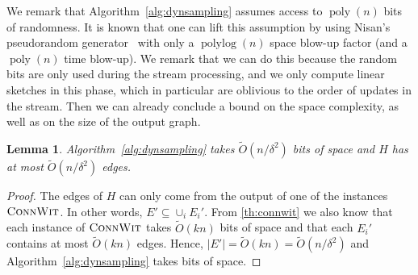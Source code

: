 \documentclass[epsfig,letter,11pt]{article}
\numberwithin{equation}{section}
\newcommand{\otil}{\tilde{O}}
\renewcommand{\tilde}{\widetilde}
\DeclareMathOperator*{\poly}{poly}
\DeclareMathOperator*{\pylog}{polylog}
\newtheorem{lemma}[theorem]{Lemma}
\begin{document}
We remark that Algorithm~\ref{alg:dynsampling} assumes access to $\poly(n)$ bits of randomness. It is known that one can lift this assumption by using Nisan's pseudorandom generator~\cite{nisansprg,lpindyk} with only a $\pylog(n)$ space blow-up factor (and a $\poly(n)$ time blow-up). We remark that we can do this because the random bits are only used during the stream processing, and we only compute linear sketches in this phase, which in particular are oblivious to the order of updates in the stream. Then we can already conclude a bound on the space complexity, as well as on the size of the output graph.
\begin{lemma}
	\label{lem:spacesampling}
	Algorithm~\ref{alg:dynsampling} takes $\otil(n/\delta^2)$ bits of space and $H$ has at most $\otil(n/\delta^2)$ edges.
\end{lemma}
\begin{proof}
	The edges of $H$ can only come from the output of one of the instances $\textsc{ConnWit}$. In other words, $E' \subseteq \cup_i E_i'$. From \cref{th:connwit} we also know that each instance of $\textsc{ConnWit}$ takes $\otil(kn)$ bits of space and that each $E_i'$ contains at most $\otil(kn)$ edges. Hence, $|E'| = \otil(kn)=\otil(n/\delta^2)$ and Algorithm~\ref{alg:dynsampling} takes \smash{$\otil(kn) = \otil(n/\delta^2)$} bits of space.
\end{proof}
\end{document}
